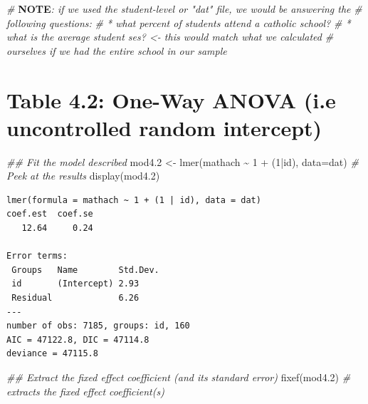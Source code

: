 \documentclass[
  letterpaper,
  DIV=11,
  numbers=noendperiod]{scrreprt}
\newenvironment{Shaded}{\begin{snugshade}}{\end{snugshade}}
\newcommand{\AlertTok}[1]{\textcolor[rgb]{1.00,0.00,0.00}{\textbf{#1}}}
\newcommand{\AttributeTok}[1]{\textcolor[rgb]{0.49,0.56,0.16}{#1}}
\newcommand{\CommentTok}[1]{\textcolor[rgb]{0.38,0.63,0.69}{\textit{#1}}}
\newcommand{\DecValTok}[1]{\textcolor[rgb]{0.25,0.63,0.44}{#1}}
\newcommand{\DocumentationTok}[1]{\textcolor[rgb]{0.73,0.13,0.13}{\textit{#1}}}
\newcommand{\FloatTok}[1]{\textcolor[rgb]{0.25,0.63,0.44}{#1}}
\newcommand{\FunctionTok}[1]{\textcolor[rgb]{0.02,0.16,0.49}{#1}}
\newcommand{\NormalTok}[1]{\textcolor[rgb]{0.00,0.44,0.13}{#1}}
\newcommand{\OtherTok}[1]{\textcolor[rgb]{0.00,0.44,0.13}{#1}}
\newcommand{\SpecialCharTok}[1]{\textcolor[rgb]{0.25,0.44,0.63}{#1}}
\begin{document}
\begin{Shaded}
\begin{Highlighting}[]
\CommentTok{\# }\AlertTok{NOTE}\CommentTok{: if we used the student{-}level or "dat" file, we would be answering the}
\CommentTok{\# following questions:}
\CommentTok{\# * what percent of students attend a catholic school?}
\CommentTok{\# * what is the average student ses? \textless{}{-} this would match what we calculated}
\CommentTok{\# ourselves if we had the entire school in our sample}
\end{Highlighting}
\end{Shaded}

\hypertarget{table-4.2-one-way-anova-i.e-uncontrolled-random-intercept}{%
\section{Table 4.2: One-Way ANOVA (i.e uncontrolled random
intercept)}\label{table-4.2-one-way-anova-i.e-uncontrolled-random-intercept}}

\begin{Shaded}
\begin{Highlighting}[]
\DocumentationTok{\#\# Fit the model described }
\NormalTok{mod4}\FloatTok{.2} \OtherTok{\textless{}{-}} \FunctionTok{lmer}\NormalTok{(mathach }\SpecialCharTok{\textasciitilde{}} \DecValTok{1} \SpecialCharTok{+}\NormalTok{ (}\DecValTok{1}\SpecialCharTok{|}\NormalTok{id), }\AttributeTok{data=}\NormalTok{dat)}
\CommentTok{\# Peek at the results}
\FunctionTok{display}\NormalTok{(mod4}\FloatTok{.2}\NormalTok{)}
\end{Highlighting}
\end{Shaded}

\begin{verbatim}
lmer(formula = mathach ~ 1 + (1 | id), data = dat)
coef.est  coef.se 
   12.64     0.24 

Error terms:
 Groups   Name        Std.Dev.
 id       (Intercept) 2.93    
 Residual             6.26    
---
number of obs: 7185, groups: id, 160
AIC = 47122.8, DIC = 47114.8
deviance = 47115.8 
\end{verbatim}

\begin{Shaded}
\begin{Highlighting}[]
\DocumentationTok{\#\# Extract the fixed effect coefficient (and it\textquotesingle{}s standard error)}
\FunctionTok{fixef}\NormalTok{(mod4}\FloatTok{.2}\NormalTok{) }\CommentTok{\# extracts the fixed effect coefficient(s)}
\end{Highlighting}
\end{Shaded}
\end{document}
